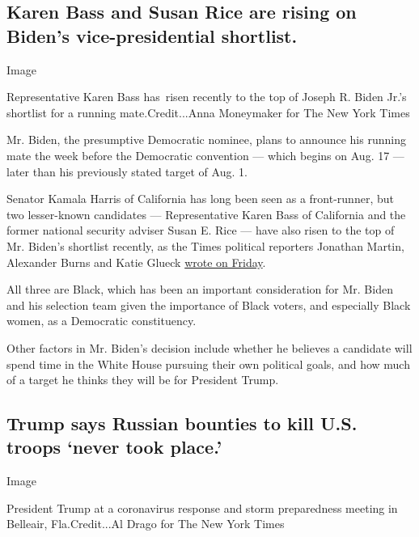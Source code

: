 \hypertarget{karen-bass-and-susan-rice-are-rising-on-bidens-vice-presidential-shortlist}{%
\subsection{Karen Bass and Susan Rice are rising on Biden's
vice-presidential
shortlist.}\label{karen-bass-and-susan-rice-are-rising-on-bidens-vice-presidential-shortlist}}

Image

Representative Karen Bass has~risen recently to the top of Joseph R.
Biden Jr.'s shortlist for a running mate.Credit...Anna Moneymaker for
The New York Times

Mr. Biden, the presumptive Democratic nominee, plans to announce his
running mate the week before the Democratic convention --- which begins
on Aug. 17 --- later than his previously stated target of Aug. 1.

Senator Kamala Harris of California has long been seen as a
front-runner, but two lesser-known candidates --- Representative Karen
Bass of California and the former national security adviser Susan E.
Rice --- have also risen to the top of Mr. Biden's shortlist recently,
as the Times political reporters Jonathan Martin, Alexander Burns and
Katie Glueck
\href{https://www.nytimes.com/2020/07/31/us/politics/joseph-biden-vice-president.html}{wrote
on Friday}.

All three are Black, which has been an important consideration for Mr.
Biden and his selection team given the importance of Black voters, and
especially Black women, as a Democratic constituency.

Other factors in Mr. Biden's decision include whether he believes a
candidate will spend time in the White House pursuing their own
political goals, and how much of a target he thinks they will be for
President Trump.

\hypertarget{trump-says-russian-bounties-to-kill-us-troops-never-took-place}{%
\subsection{Trump says Russian bounties to kill U.S. troops `never took
place.'}\label{trump-says-russian-bounties-to-kill-us-troops-never-took-place}}

Image

President Trump at a coronavirus response and storm preparedness meeting
in Belleair, Fla.Credit...Al Drago for The New York Times

